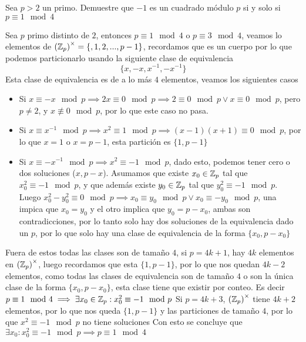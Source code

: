 \begin{prob}[3 pts]
	Sea $p>2$ un primo. Demuestre que $-1$ es un cuadrado módulo $p$ si y solo si $p\equiv1\mod4$
\end{prob}

\begin{sol}
	Sea $p$ primo distinto de $2$, entonces $p\equiv 1\mod 4$ o $p\equiv 3 \mod 4$, veamos lo elementos de $\left(\mathbb{Z}_p\right)^\times=\{,1,2,...,p-1\}$, recordamos que es un cuerpo por lo que podemos particionarlo usando la siguiente clase de equivalencia
	\[\{x,-x,x^{-1},-x^{-1}\}\]
	Esta clase de equivalencia es de a lo más $4$ elementos, veamos los siguientes casos
	\begin{itemize}
		\item Si $x\equiv -x\mod p\implies 2x\equiv 0\mod p\implies 2\equiv 0\mod p\vee x\equiv 0\mod p$, pero $p\neq2$, y $x\not\equiv 0\mod p$, por lo que este caso no pasa.

		\item Si $x\equiv x^{-1}\mod p\implies x^2\equiv 1\mod p\implies (x-1)(x+1)\equiv 0 \mod p$, por lo que $x=1$ o $x=p-1$, esta partición es $\{1,p-1\}$

		\item Si $x\equiv -x^{-1}\mod p\implies x^2\equiv -1\mod p$, dado esto, podemos tener cero o dos soluciones ($x, p-x$). Asumamos que existe $x_0\in\mathbb{Z}_p$ tal que $x_0^2\equiv -1\mod p$, y que además existe $y_0\in\mathbb{Z}_p$ tal que $y_0^2\equiv -1\mod p$. Luego $x_0^2-y_0^2\equiv 0\mod p\implies x_0\equiv y_0\mod p \vee x_0\equiv -y_0\mod p$, una impica que $x_0=y_0$ y el otro implica que $y_0=p-x_0$, ambas son contradicciones, por lo tanto solo hay dos soluciones de la equivalencia dado un $p$, por lo que solo hay una clase de equivalencia de la forma $\{x_0,p-x_0\}$
	\end{itemize}
	Fuera de estos todas las clases son de tamaño $4$, si $p=4k+1$, hay $4k$ elementos en $\left(\mathbb{Z}_p\right)^\times$, luego recordamos que esta $\{1,p-1\}$, por lo que nos quedan $4k-2$ elementos, como todas las clases de equivalencia son de tamaño $4$ o son la única clase de la forma $\{x_0,p-x_0\}$, esta clase tiene que existir por conteo.
	Es decir $p\equiv1\mod 4\implies\exists x_0\in\mathbb{Z}_p:x_0^2\equiv-1\mod p$
	Si $p=4k+3$, $\left(\mathbb{Z}_p\right)^\times$ tiene $4k+2$ elementos, por lo que nos queda $\{1,p-1\}$ y las particiones de tamaño $4$, por lo que $x^2\equiv -1\mod p$ no tiene soluciones
	Con esto se concluye que $\exists x_0:x_0^2\equiv -1\mod p\implies p\equiv1\mod 4$
\end{sol}

